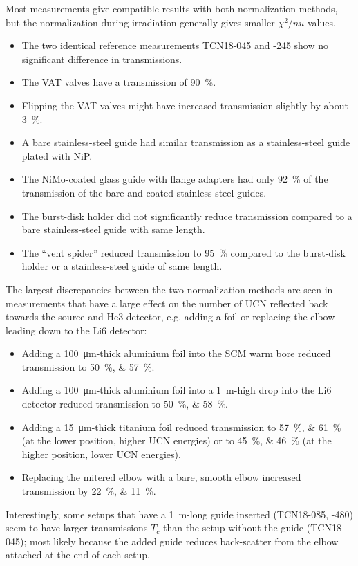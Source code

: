 \documentclass[10pt,letterpaper]{article}
\begin{document}
Most measurements give compatible results with both normalization methods, but the normalization during irradiation generally gives smaller $\chi^2/nu$ values.
\begin{itemize}
\item The two identical reference measurements TCN18-045 and -245 show no significant difference in transmissions.
\item The VAT valves have a transmission of \SI{90}{\percent}.
\item Flipping the VAT valves might have increased transmission slightly by about \SI{3}{\percent}.
\item A bare stainless-steel guide had similar transmission as a stainless-steel guide plated with NiP.
\item The NiMo-coated glass guide with flange adapters had only \SI{92}{\percent} of the transmission of the bare and coated stainless-steel guides.
\item The burst-disk holder did not significantly reduce transmission compared to a bare stainless-steel guide with same length.
\item The ``vent spider'' reduced transmission to \SI{95}{\percent} compared to the burst-disk holder or a stainless-steel guide of same length.
\end{itemize}
The largest discrepancies between the two normalization methods are seen in measurements that have a large effect on the number of UCN reflected back towards the source and He3 detector, e.g. adding a foil or replacing the elbow leading down to the Li6 detector:
\begin{itemize}
\item Adding a \SI{100}{\micro\meter}-thick aluminium foil into the SCM warm bore reduced transmission to \SIlist{50;57}{\percent}.
\item Adding a \SI{100}{\micro\meter}-thick aluminium foil into a \SI{1}{\meter}-high drop into the Li6 detector reduced transmission to \SIlist{50;58}{\percent}.
\item Adding a \SI{15}{\micro\meter}-thick titanium foil reduced transmission to \SIlist{57;61}{\percent} (at the lower position, higher UCN energies) or to \SIlist{45;46}{\percent} (at the higher position, lower UCN energies).
\item Replacing the mitered elbow with a bare, smooth elbow increased transmission by \SIlist{22;11}{\percent}.
\end{itemize}

Interestingly, some setups that have a \SI{1}{\meter}-long guide inserted (TCN18-085, -480) seem to have larger transmissions $T_c$ than the setup without the guide (TCN18-045); most likely because the added guide reduces back-scatter from the elbow attached at the end of each setup.
\end{document}
